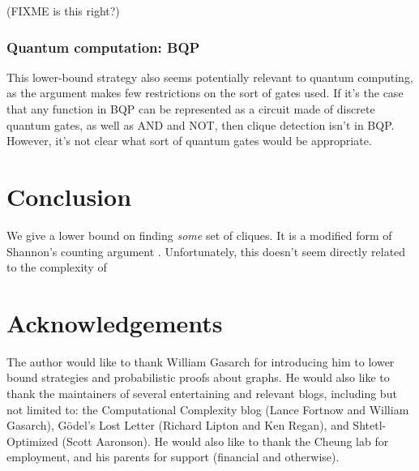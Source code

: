 \documentclass[12pt]{article}
\theoremstyle{definition}
\begin{document}
(FIXME is this right?)

\subsubsection{Quantum computation: BQP}

This lower-bound strategy also seems potentially
relevant to quantum computing,
as the argument makes few restrictions on the sort of gates used.
If it's the case that any function in BQP can be represented
as a circuit made of discrete quantum gates, as well as AND and NOT,
then clique detection isn't in BQP.
However, it's not clear what sort of quantum gates would be
appropriate.

\section{Conclusion}

We give a lower bound on finding {\em some} set of cliques.
It is a modified form of Shannon's counting argument
\cite{shannon_synthesis_1949}. Unfortunately,
this doesn't seem directly related to the
complexity of 

\section{Acknowledgements}

The author would like to thank William Gasarch for introducing him
to lower bound strategies and probabilistic proofs about graphs.
He would also like to thank the maintainers of
several entertaining and relevant blogs, including but
not limited to: the Computational Complexity blog
(Lance Fortnow and William Gasarch), 
G\"odel's Lost Letter (Richard Lipton and Ken Regan),
and Shtetl-Optimized (Scott Aaronson). 
He would
also like to thank the Cheung lab for
employment, and his parents for support
(financial and otherwise).



\end{document}

